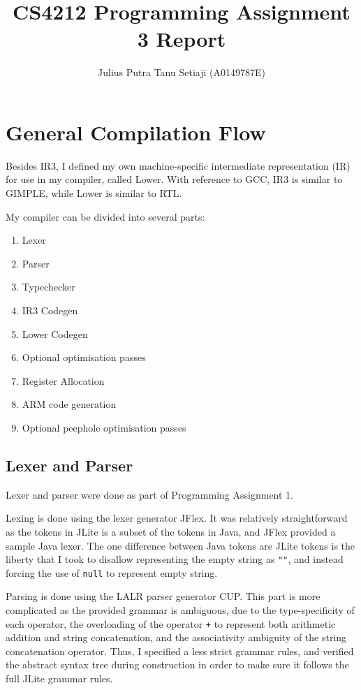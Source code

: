 \documentclass[nonacm, acmsmall, screen, 10pt]{acmart}
\begin{document}
\title{CS4212 Programming Assignment 3 Report}
\author{Julius Putra Tanu Setiaji (A0149787E)}\makeatletter\let\@authorsaddresses\@empty\makeatother%
\maketitle
\tableofcontents

\section{General Compilation Flow}
Besides IR3, I defined my own machine-specific intermediate representation (IR) for use in my compiler, called Lower.
With reference to GCC, IR3 is similar to GIMPLE, while Lower is similar to RTL.

My compiler can be divided into several parts:
\begin{enumerate}
  \item Lexer
  \item Parser
  \item Typechecker
  \item IR3 Codegen
  \item Lower Codegen
  \item Optional optimisation passes
  \item Register Allocation
  \item ARM code generation
  \item Optional peephole optimisation passes
\end{enumerate}

\subsection{Lexer and Parser}
Lexer and parser were done as part of Programming Assignment 1.

Lexing is done using the lexer generator JFlex.
It was relatively straightforward as the tokens in JLite is a subset of the tokens in Java, and JFlex provided a sample Java lexer.
The one difference between Java tokens are JLite tokens is the liberty that I took to disallow representing the empty string as \texttt{""}, and instead forcing the use of \texttt{null} to represent empty string.

Parsing is done using the LALR parser generator CUP.
This part is more complicated as the provided grammar is ambiguous, due to the type-specificity of each operator, the overloading of the operator \texttt{+} to represent both arithmetic addition and string concatenation, and the associativity ambiguity of the string concatenation operator.
Thus, I specified a less strict grammar rules, and verified the abstract syntax tree during construction in order to make sure it follows the full JLite grammar rules.
\end{document}
